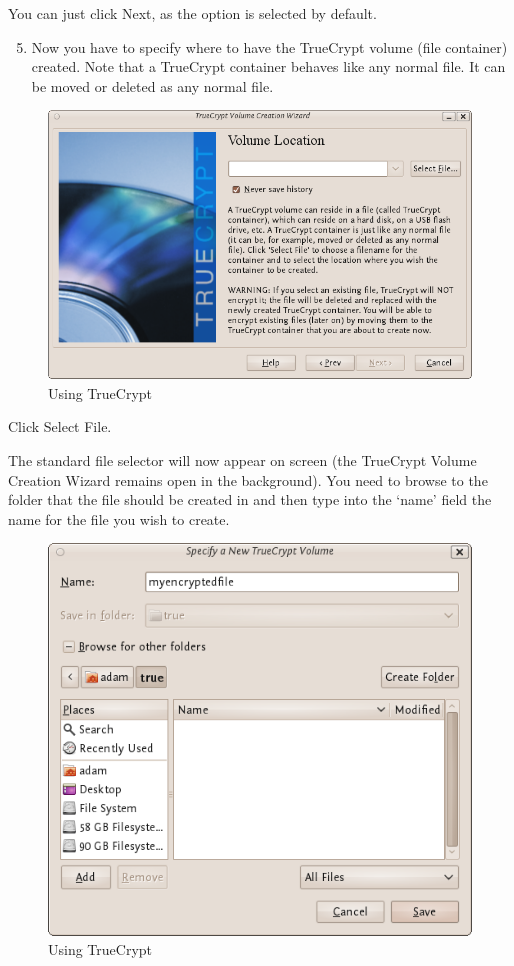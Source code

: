 You can just click Next, as the option is selected by default.

\begin{enumerate}[1.]
\setcounter{enumi}{4}
\item
  Now you have to specify where to have the TrueCrypt volume (file
  container) created. Note that a TrueCrypt container behaves like any
  normal file. It can be moved or deleted as any normal file.
\end{enumerate}
\begin{figure}[htbp]
\centering
\includegraphics{using_tc_004.png}
\caption{Using TrueCrypt}
\end{figure}

Click Select File.

The standard file selector will now appear on screen (the TrueCrypt
Volume Creation Wizard remains open in the background). You need to
browse to the folder that the file should be created in and then type
into the `name' field the name for the file you wish to create.

\begin{figure}[htbp]
\centering
\includegraphics{using_tc_005.png}
\caption{Using TrueCrypt}
\end{figure}

